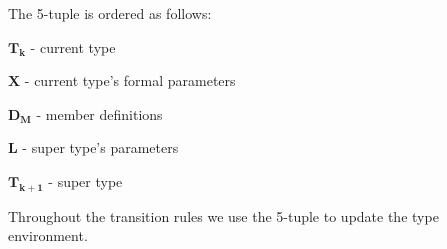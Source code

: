 The 5-tuple is ordered as follows:

\begin{nlist}
\item $\mathbf{T_{k}}$ - current type
  \item $\mathbf{X}$ - current type's formal parameters
  \item $\mathbf{D_{M}}$ - member definitions
  \item $\mathbf{L}$ - super type's parameters
  \item $\mathbf{T_{k+1}}$ - super type
\end{nlist}

Throughout the transition rules we use the 5-tuple to update the type environment.
